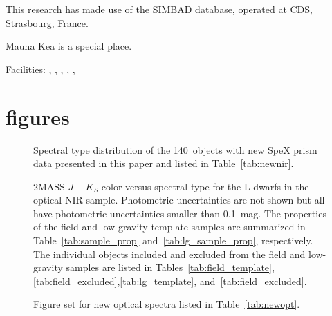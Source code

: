 \documentclass[12pt,preprint]{aastex}
\newcommand{\prismspectra}{140} %
\begin{document}
This research has made use of the SIMBAD database, operated at CDS, Strasbourg, France.

Mauna Kea is a special place.

Facilities: 
, 
,
, 
,
, 
                                     

%


\clearpage 
\section{figures}

\begin{figure}
		\caption{Spectral type distribution of the \prismspectra~objects with new SpeX prism data presented in this paper and listed in Table~\ref{tab:newnir}.}
	\label{fig:newdata_spthist}
\end{figure}

\begin{figure}
		\caption{2MASS $J-K_S$ color versus spectral type for the L dwarfs in the optical-NIR sample. 
		Photometric uncertainties are not shown but all have photometric uncertainties smaller than 0.1~mag. 		
		The properties of the field and low-gravity template samples are summarized in Table~\ref{tab:sample_prop} and~\ref{tab:lg_sample_prop}, respectively. The individual objects included and excluded from the field and low-gravity samples are listed in Tables~\ref{tab:field_template},\ref{tab:field_excluded},\ref{tab:lg_template}, and~\ref{tab:field_excluded}. }
	\label{fig:JK_colors}
\end{figure}

\begin{figure}
		\caption{Figure set for new optical spectra listed in Table~\ref{tab:newopt}.}
	\label{fig:newopt}
\end{figure}
\end{document}
